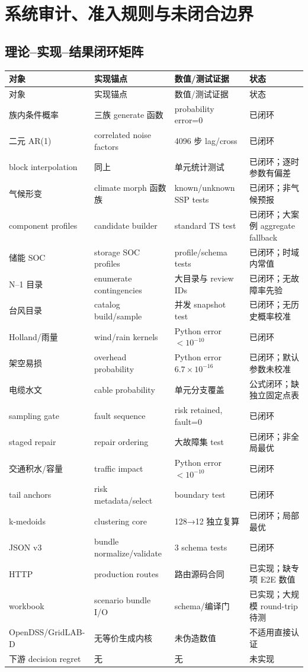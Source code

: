 \section{系统审计、准入规则与未闭合边界}
\label{sec:scenario-audit-admission}

\subsection{理论--实现--结果闭环矩阵}
\begin{longtable}{@{}L{3.6cm}L{4.0cm}L{3.6cm}L{3.2cm}@{}}
\toprule
对象 & 实现锚点 & 数值/测试证据 & 状态\\
\midrule\endfirsthead
\toprule 对象 & 实现锚点 & 数值/测试证据 & 状态\\\midrule\endhead
族内条件概率 & 三族 generate 函数 & probability error=0 & 已闭环\\
二元 AR(1) & correlated noise factors & 4096 步 lag/cross & 已闭环\\
block interpolation & 同上 & 单元统计测试 & 已闭环；逐时参数有偏差\\
气候形变 & climate morph 函数族 & known/unknown SSP tests & 已闭环；非气候预报\\
component profiles & candidate builder & standard TS test & 已闭环；大案例 aggregate fallback\\
储能 SOC & storage SOC profiles & profile/schema tests & 已闭环；时域内常值\\
N--1 目录 & enumerate contingencies & 大目录与 review IDs & 已闭环；无故障率先验\\
台风目录 & catalog build/sample & 并发 snapshot test & 已闭环；无历史概率校准\\
Holland/雨量 & wind/rain kernels & Python error $<10^{-10}$ & 已闭环\\
架空易损 & overhead probability & Python error $6.7\times10^{-16}$ & 已闭环；默认参数未校准\\
电缆水文 & cable probability & 单元分支覆盖 & 公式闭环；缺独立固定点表\\
sampling gate & fault sequence & risk retained, fault=0 & 已闭环\\
staged repair & repair ordering & 大故障集 test & 已闭环；非全局最优\\
交通积水/容量 & traffic impact & Python error $<10^{-10}$ & 已闭环\\
tail anchors & risk metadata/select & boundary test & 已闭环\\
k-medoids & clustering core & 128→12 独立复算 & 已闭环；局部最优\\
JSON v3 & bundle normalize/validate & 3 schema tests & 已闭环\\
HTTP & production routes & 路由源码合同 & 已实现；缺专项 E2E 数值\\
workbook & scenario bundle I/O & schema/编译门 & 已实现；大规模 round-trip 待测\\
OpenDSS/GridLAB-D & 无等价生成内核 & 未伪造数值 & 不适用直接认证\\
下游 decision regret & 无 & 无 & 未实现\\
\bottomrule
\end{longtable}


